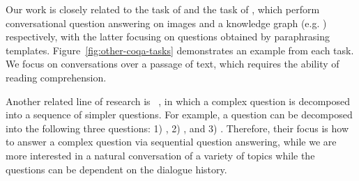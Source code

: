 Our work is closely related to the  task of \cite{das2017visual} and the  task of \cite{saha2018complex}, which perform conversational question answering on images and a knowledge graph (e.g. ) respectively, with the latter focusing on questions obtained by paraphrasing templates. Figure~\ref{fig:other-coqa-tasks} demonstrates an example from each task. We focus on conversations over a passage of text, which requires the ability of reading comprehension.

Another related line of research is ~\cite{iyyer2017search,talmor2018web}, in which a complex question is decomposed into a sequence of simpler questions. For example, a question  can be decomposed into the following three questions: 1) , 2) , and 3) . Therefore, their focus is how to answer a complex question via sequential question answering, while we are more interested in a natural conversation of a variety of topics while the questions can be dependent on the dialogue history.
